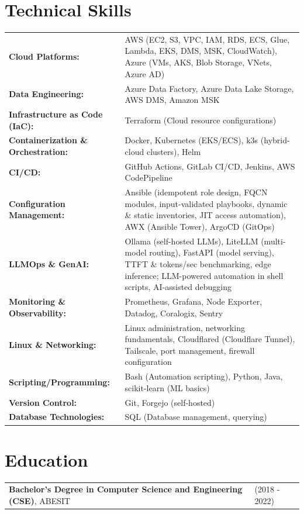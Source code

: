 \documentclass[a4paper,12pt]{article}
\begin{document}
\section{Technical Skills}
\begin{tabularx}{\linewidth}{@{}>{\bfseries}l X@{}}
Cloud Platforms: & AWS (EC2, S3, VPC, IAM, RDS, ECS, Glue, Lambda, EKS, DMS, MSK, CloudWatch), Azure (VMs, AKS, Blob Storage, VNets, Azure AD) \\
Data Engineering: & Azure Data Factory, Azure Data Lake Storage, AWS DMS, Amazon MSK \\
Infrastructure as Code (IaC): & Terraform (Cloud resource configurations) \\
Containerization \& Orchestration: & Docker, Kubernetes (EKS/ECS), k3s (hybrid-cloud clusters), Helm \\
CI/CD: & GitHub Actions, GitLab CI/CD, Jenkins, AWS CodePipeline \\
Configuration Management: & Ansible (idempotent role design, FQCN modules, input-validated playbooks, dynamic \& static inventories, JIT access automation), AWX (Ansible Tower), ArgoCD (GitOps) \\
LLMOps \& GenAI: & Ollama (self-hosted LLMs), LiteLLM (multi-model routing), FastAPI (model serving), TTFT \& tokens/sec benchmarking, edge inference; LLM-powered automation in shell scripts, AI-assisted debugging \\
Monitoring \& Observability: & Prometheus, Grafana, Node Exporter, Datadog, Coralogix, Sentry \\
Linux \& Networking: & Linux administration, networking fundamentals, Cloudflared (Cloudflare Tunnel), Tailscale, port management, firewall configuration \\
Scripting/Programming: & Bash (Automation scripting), Python, Java, scikit-learn (ML basics) \\
Version Control: & Git, Forgejo (self-hosted) \\
Database Technologies: & SQL (Database management, querying) \\
\end{tabularx}
\section{Education}
\begin{tabularx}{\linewidth}{@{}l X@{}}
\textbf{Bachelor’s Degree in Computer Science and Engineering (CSE)}, ABESIT & \hfill \normalsize (2018 - 2022) \\
\end{tabularx}
\end{document}
